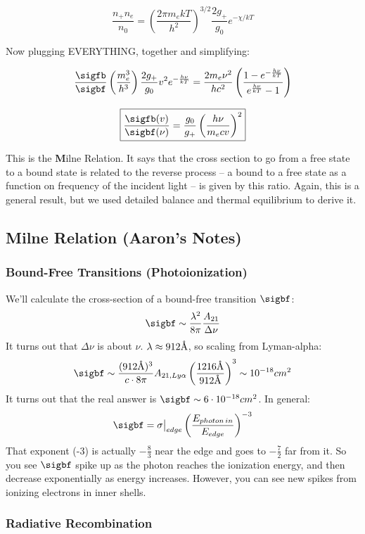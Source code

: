 \documentclass{article}
\newcommand{\angstrom}{\mbox{\normalfont\AA}}
\def\eval#1{\big|_{#1}}
\def\eval#1{\big|_{#1}}
\begin{document}
$$
\frac{n_+ n_e}{n_0} = \left(\frac{2\pi m_e kT}{h^2}\right)^{3/2} \frac{2g_+}{g_0}e^{-\chi/kT}
$$

Now plugging EVERYTHING, together and simplifying:

$$
\frac{\sigfb}{\sigbf} \left(\frac{m_e^3}{h^3}\right)\frac{2g_+}{g_0}v^2 e^{-\frac{h\nu}{kT}} = \frac{2m_e \nu^2}{hc^2}\left(\frac{1-e^{-\frac{h\nu}{kT}}}{e^{\frac{h\nu}{kT}} - 1}\right)
$$

$$
\boxed{\frac{\sigfb(v)}{\sigbf(\nu)} = \frac{g_0}{g_+}\left(\frac{h\nu}{m_e c v}\right)^2}
$$

This is the {\textbf Milne Relation}. It says that the cross section to go from a free state to a bound state is related to the reverse process -- a bound to a free state as a function on frequency of the incident light -- is given by this ratio. Again, this is a general result, but we used detailed balance and thermal equilibrium to derive it. 

\subsection{Milne Relation (Aaron's Notes)}

\subsubsection{ Bound-Free Transitions (Photoionization)}

We'll calculate the cross-section of a bound-free transition $\sigbf$:
$$\sigbf\sim\frac{\lambda^2}{ 8\pi}\frac{A_{21}}{ \Delta\nu}$$
It turns out that $\Delta\nu$ is about $\nu$. $\lambda\approx 912\angstrom$, 
so scaling from Lyman-alpha:
$$\sigbf\sim\frac{(912\angstrom)^3}{ c\cdot8\pi}A_{21,Ly\alpha}
\left(\frac{1216\angstrom}{912\angstrom}\right)^3\sim 10^{-18}cm^2$$
It turns out that the real answer is $\sigbf\sim 6\cdot 10^{-18}cm^2$.  In
general:
$$\sigbf=\sigma\eval{edge}\left(\frac{E_{photon\,in}}{ E_{edge}}\right)^{-3}$$
That exponent (-3) is actually $-\frac83$ near the edge and goes to $-\frac72$
far from it.  So you see $\sigbf$ spike up as the photon reaches the 
ionization energy, and then decrease exponentially as energy increases.
However, you can see new spikes from ionizing electrons in inner shells.

\subsubsection{Radiative Recombination}
\end{document}

